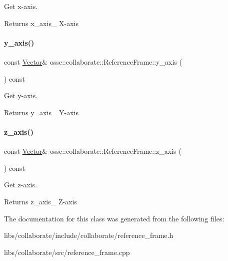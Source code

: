 Get x-\/axis. 

\begin{DoxyReturn}{Returns}
x\+\_\+axis\+\_\+ X-\/axis 
\end{DoxyReturn}
\mbox{\label{classosse_1_1collaborate_1_1_reference_frame_ae37a2e46a6ed1868a12829e461e6e423}} 
\paragraph{\texorpdfstring{y\+\_\+axis()}{y\_axis()}}
{\footnotesize\ttfamily const \hyperlink{classosse_1_1collaborate_1_1_vector}{Vector}\& osse\+::collaborate\+::\+Reference\+Frame\+::y\+\_\+axis (\begin{DoxyParamCaption}{ }\end{DoxyParamCaption}) const\hspace{0.3cm}{\ttfamily [inline]}}



Get y-\/axis. 

\begin{DoxyReturn}{Returns}
y\+\_\+axis\+\_\+ Y-\/axis 
\end{DoxyReturn}
\mbox{\label{classosse_1_1collaborate_1_1_reference_frame_ad3fcddd11a85e828e7de51b333bdf12b}} 
\paragraph{\texorpdfstring{z\+\_\+axis()}{z\_axis()}}
{\footnotesize\ttfamily const \hyperlink{classosse_1_1collaborate_1_1_vector}{Vector}\& osse\+::collaborate\+::\+Reference\+Frame\+::z\+\_\+axis (\begin{DoxyParamCaption}{ }\end{DoxyParamCaption}) const\hspace{0.3cm}{\ttfamily [inline]}}



Get z-\/axis. 

\begin{DoxyReturn}{Returns}
z\+\_\+axis\+\_\+ Z-\/axis 
\end{DoxyReturn}


The documentation for this class was generated from the following files\+:\begin{DoxyCompactItemize}
\item 
libs/collaborate/include/collaborate/reference\+\_\+frame.\+h\item 
libs/collaborate/src/reference\+\_\+frame.\+cpp\end{DoxyCompactItemize}
